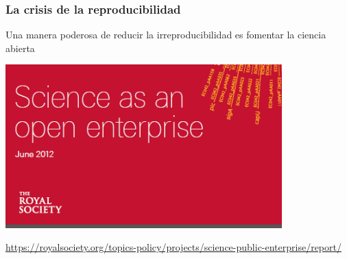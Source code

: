 \documentclass[9pt]{beamer}
\begin{document}
\begin{frame}
  \frametitle{La crisis de la reproducibilidad}
    \begin{overlayarea}{\textwidth}{\textheight}
  Una manera poderosa de reducir la irreproducibilidad es fomentar la
  ciencia abierta\vspace{-0.5cm}\\ 
    \begin{center}
    \includegraphics[width=0.8\textwidth]{images/science_as_open_enterprise}
  \end{center}\vspace{-0.5cm}
\hfill {\tiny \href{https://royalsociety.org/topics-policy/projects/science-public-enterprise/report/}{https://royalsociety.org/topics-policy/projects/science-public-enterprise/report/}}
  \begin{center}
      
\end{center}
\end{overlayarea}
\end{frame}
\end{document}
